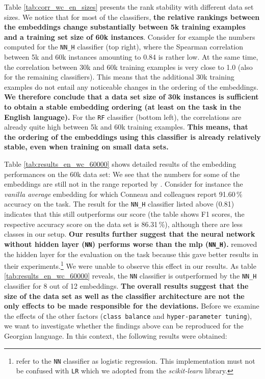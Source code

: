 Table \vref{tab:corr_wc_en_sizes} presents the rank stability with different data set sizes. We notice that for most of the classifiers, \textbf{the relative rankings between the embeddings change substantially between 5k training examples and a training set size of 60k instances}. Consider for example the numbers computed for the \texttt{NN\_H} classifier (top right), where the Spearman correlation between 5k and 60k instances amounting to 0.84 is rather low. At the same time, the correlation between 30k and 60k training examples is very close to 1.0 (also for the remaining classifiers). This means that the additional 30k training examples do not entail any noticeable changes in the ordering of the embeddings. \textbf{We therefore conclude that a data set size of 30k instances is sufficient to obtain a stable embedding ordering (at least on the  task in the English language).} For the \texttt{RF} classifier (bottom left), the correlations are already quite high between 5k and 60k training examples. \textbf{This means, that the ordering of the embeddings using this classifier is already relatively stable, even when training on small data sets.}



Table \vref{tab:results_en_wc_60000} shows detailed results of the embedding performances on the 60k data set: We see that the numbers for some of the embeddings are still not in the range reported by \citep{Perone.2018,Conneau.2018a}. Consider for instance the \textit{vanilla average} embedding for which Conneau and colleagues report 91.60\,\% accuracy on the  task. The result for the \texttt{NN\_H} classifier listed above (0.81) indicates that this still outperforms our score (the table shows F1 scores, the respective accuracy score on the data set is 86.31\,\%), although there are less classes in our setup. \textbf{Our results further suggest that the neural network without hidden layer (\texttt{NN}) performs worse than the \gls{mlp} (\texttt{NN\_H}).} \citep{Perone.2018,Conneau.2018a} removed the hidden layer for the evaluation on the  task because this gave better results in their experiments.\footnote{\citep{Conneau.2018a} refer to the \texttt{NN} classifier as logistic regression. This implementation must not be confused with \texttt{LR} which we adopted from the \textit{scikit-learn} library.} We were unable to observe this effect in our results. As table \vref{tab:results_en_wc_60000} reveals, the \texttt{NN} classifier is outperformed by the \texttt{NN\_H} classifier for 8 out of 12 embeddings. \textbf{The overall results suggest that the size of the data set as well as the classifier architecture are not the only effects to be made responsible for the deviations.} Before we examine the effects of the other factors (\texttt{class balance} and \texttt{hyper-parameter tuning}), we want to investigate whether the findings above can be reproduced for the Georgian language. In this context, the following results were obtained:

